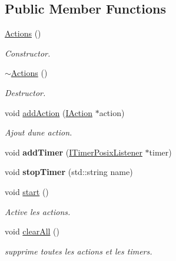 \subsection*{Public Member Functions}
\begin{DoxyCompactItemize}
\item 
\mbox{\label{classActions_ace0fce73fe3cfb2ea7112cfdbf12b131}} 
\hyperlink{classActions_ace0fce73fe3cfb2ea7112cfdbf12b131}{Actions} ()
\begin{DoxyCompactList}\small\item\em Constructor. \end{DoxyCompactList}\item 
\mbox{\label{classActions_a0d03028ad72e0031f3d903493932aea1}} 
\hyperlink{classActions_a0d03028ad72e0031f3d903493932aea1}{$\sim$\+Actions} ()
\begin{DoxyCompactList}\small\item\em Destructor. \end{DoxyCompactList}\item 
void \hyperlink{classActions_a710f952f5942e626d73e47733a8848b0}{add\+Action} (\hyperlink{classIAction}{I\+Action} $\ast$action)
\begin{DoxyCompactList}\small\item\em Ajout d\textquotesingle{}une action. \end{DoxyCompactList}\item 
\mbox{\label{classActions_a861130fdcc3238961cb93b5b96475e8f}} 
void {\bfseries add\+Timer} (\hyperlink{classITimerPosixListener}{I\+Timer\+Posix\+Listener} $\ast$timer)
\item 
\mbox{\label{classActions_a49459ae072ed1f6ea6a69966a0ad4409}} 
void {\bfseries stop\+Timer} (std\+::string name)
\item 
void \hyperlink{classActions_adf0dec391b032c0b36b329a3f039001e}{start} ()
\begin{DoxyCompactList}\small\item\em Active les actions. \end{DoxyCompactList}\item 
\mbox{\label{classActions_a95422cfe6edb166b22bc6aa465aab866}} 
void \hyperlink{classActions_a95422cfe6edb166b22bc6aa465aab866}{clear\+All} ()
\begin{DoxyCompactList}\small\item\em supprime toutes les actions et les timers. \end{DoxyCompactList}\item 

\end{DoxyCompactItemize}
